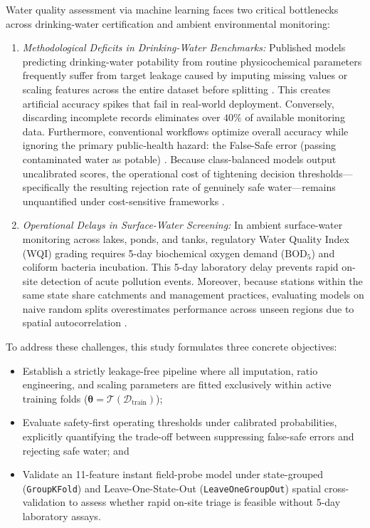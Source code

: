 \documentclass[pdflatex,sn-mathphys-num]{sn-jnl}%
\theoremstyle{thmstyleone}%
\theoremstyle{thmstyletwo}%
\theoremstyle{thmstylethree}%
\begin{document}
Water quality assessment via machine learning faces two critical bottlenecks across drinking-water certification and ambient environmental monitoring:
\begin{enumerate}
    \item \textit{Methodological Deficits in Drinking-Water Benchmarks:} Published models predicting drinking-water potability from routine physicochemical parameters frequently suffer from target leakage caused by imputing missing values or scaling features across the entire dataset before splitting \cite{kaufman2012,kapoor2023}. This creates artificial accuracy spikes that fail in real-world deployment. Conversely, discarding incomplete records eliminates over $40\%$ of available monitoring data. Furthermore, conventional workflows optimize overall accuracy while ignoring the primary public-health hazard: the False-Safe error (passing contaminated water as potable) \cite{elkan2001,he2009}. Because class-balanced models output uncalibrated scores, the operational cost of tightening decision thresholds---specifically the resulting rejection rate of genuinely safe water---remains unquantified under cost-sensitive frameworks \cite{he2009}.
    \item \textit{Operational Delays in Surface-Water Screening:} In ambient surface-water monitoring across lakes, ponds, and tanks, regulatory Water Quality Index (WQI) grading \cite{brown1970,tyagi2013} requires 5-day biochemical oxygen demand ($\text{BOD}_5$) and coliform bacteria incubation. This 5-day laboratory delay prevents rapid on-site detection of acute pollution events. Moreover, because stations within the same state share catchments and management practices, evaluating models on naive random splits overestimates performance across unseen regions due to spatial autocorrelation \cite{roberts2017,ploton2020}.
\end{enumerate}

To address these challenges, this study formulates three concrete objectives:
\begin{itemize}
    \item Establish a strictly leakage-free pipeline where all imputation, ratio engineering, and scaling parameters are fitted exclusively within active training folds ($\boldsymbol{\theta} = \mathcal{T}(\mathcal{D}_{\text{train}})$);
    \item Evaluate safety-first operating thresholds under calibrated probabilities, explicitly quantifying the trade-off between suppressing false-safe errors and rejecting safe water; and
    \item Validate an 11-feature instant field-probe model under state-grouped (\texttt{GroupKFold}) and Leave-One-State-Out (\texttt{LeaveOneGroupOut}) spatial cross-validation to assess whether rapid on-site triage is feasible without 5-day laboratory assays.
\end{itemize}
\end{document}
